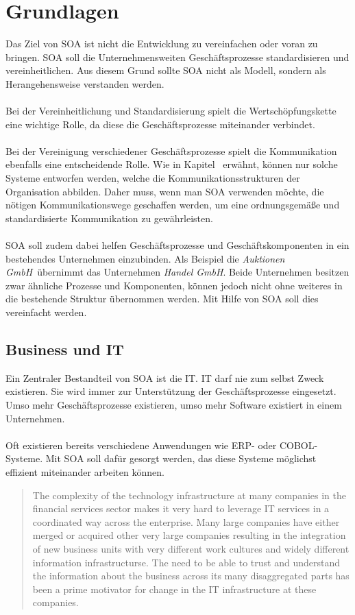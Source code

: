 \section{Grundlagen}
\label{sec:Grundlagen}
Das Ziel von SOA ist nicht die Entwicklung zu vereinfachen oder voran zu bringen. SOA soll die Unternehmensweiten Geschäftsprozesse standardisieren und vereinheitlichen. Aus diesem Grund sollte SOA nicht als Modell, sondern als Herangehensweise verstanden werden.
\\\\
Bei der Vereinheitlichung und Standardisierung spielt die Wertschöpfungskette eine wichtige Rolle, da diese die Geschäftsprozesse miteinander verbindet.
\\\\
Bei der Vereinigung verschiedener Geschäftsprozesse spielt die Kommunikation ebenfalls eine entscheidende Rolle. Wie in Kapitel \ erwähnt, können nur solche Systeme entworfen werden, welche die Kommunikationsstrukturen der Organisation abbilden. Daher muss, wenn man SOA verwenden möchte, die nötigen Kommunikationswege geschaffen werden, um eine ordnungsgemäße und standardisierte Kommunikation zu gewährleisten.
\\\\
SOA soll zudem dabei helfen Geschäftsprozesse und Geschäftskomponenten in ein bestehendes Unternehmen einzubinden. Als Beispiel die \textit{Auktionen GmbH}\ übernimmt das Unternehmen \textit{Handel GmbH}. Beide Unternehmen besitzen zwar ähnliche Prozesse und Komponenten, können jedoch nicht ohne weiteres in die bestehende Struktur übernommen werden. Mit Hilfe von SOA soll dies vereinfacht werden.

\subsection{Business und IT}
\label{subsec:BusinessAndIT}
Ein Zentraler Bestandteil von SOA ist die IT. IT darf nie zum selbst Zweck existieren. Sie wird immer zur Unterstützung der Geschäftsprozesse eingesetzt. Umso mehr Geschäftsprozesse existieren, umso mehr Software existiert in einem Unternehmen.
\\\\
Oft existieren bereits verschiedene Anwendungen wie ERP- oder COBOL-Systeme. Mit SOA soll dafür gesorgt werden, das diese Systeme möglichst effizient miteinander arbeiten können.
\begin{quotation}
    \frqq The complexity of the technology infrastructure at many companies in the financial services sector makes it very hard to leverage IT services in a coordinated way across the enterprise. Many large companies have either merged or acquired other very large companies resulting in the integration of new business units with very different work cultures and widely different information infrastructurse. The need to be able to trust and understand the information about the business across its many disaggregated parts has been a prime motivator for change in the IT infrastructure at these companies.\flqq \cite[S. 17]{SOAForDummies}
\end{quotation}

